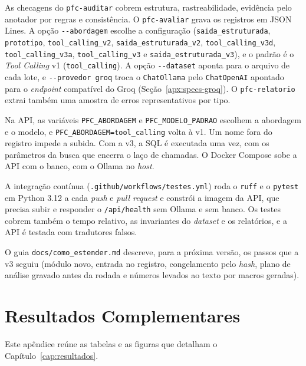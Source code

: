 As checagens do \texttt{pfc-auditar} cobrem estrutura, rastreabilidade, evidência pelo anotador por regras e consistência. O \texttt{pfc-avaliar} grava os registros em JSON Lines. A opção \texttt{-{}-abordagem} escolhe a configuração (\texttt{saida\_estruturada}, \texttt{prototipo}, \texttt{tool\_calling\_v2}, \texttt{saida\_estruturada\_v2}, \texttt{tool\_calling\_v3d}, \texttt{tool\_calling\_v3a}, \texttt{tool\_calling\_v3} e \texttt{saida\_estruturada\_v3}), e o padrão é o \textit{Tool Calling} v1 (\texttt{tool\_calling}). A opção \texttt{-{}-dataset} aponta para o arquivo de cada lote, e \texttt{-{}-provedor groq} troca o \texttt{ChatOllama} pelo \texttt{ChatOpenAI} apontado para o \textit{endpoint} compatível do Groq (Seção~\ref{apx:specs-groq}). O \texttt{pfc-relatorio} extrai também uma amostra de erros representativos por tipo.

Na API, as variáveis \texttt{PFC\_ABORDAGEM} e \texttt{PFC\_MODELO\_PADRAO} escolhem a abordagem e o modelo, e \texttt{PFC\_ABORDAGEM=tool\_calling} volta à v1. Um nome fora do registro impede a subida. Com a v3, a SQL é executada uma vez, com os parâmetros da busca que encerra o laço de chamadas. O Docker Compose sobe a API com o banco, com o Ollama no \textit{host}.

A integração contínua (\texttt{.github/\allowbreak workflows/\allowbreak testes.yml}) roda o \texttt{ruff} e o \texttt{pytest} em Python 3.12 a cada \textit{push} e \textit{pull request} e constrói a imagem da API, que precisa subir e responder o \texttt{/api/health} sem Ollama e sem banco. Os testes cobrem também o tempo relativo, as invariantes do \textit{dataset} e os relatórios, e a API é testada com tradutores falsos.

O guia \texttt{docs/como\_estender.md} descreve, para a próxima versão, os passos que a v3 seguiu (módulo novo, entrada no registro, congelamento pelo \textit{hash}, plano de análise gravado antes da rodada e números levados ao texto por macros geradas).

\chapter{Resultados Complementares}
\label{apx:resultados}

Este apêndice reúne as tabelas e as figuras que detalham o Capítulo~\ref{cap:resultados}.

